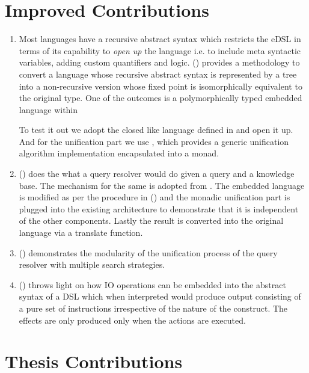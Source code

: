 \documentclass[thesis-solanki.tex]{subfiles}
\begin{document}
\section{Improved Contributions}
\begin{enumerate}
\item Most languages have a recursive abstract syntax which restricts the eDSL in terms of its capability to \textit{open up} the language i.e. to
include meta syntactic variables, adding custom quantifiers and logic. () provides a 
methodology to convert a language whose recursive abstract syntax is represented by a tree into a non-recursive version whose 
fixed point is isomorphically equivalent to the original type. One of the outcomes is a polymorphically typed embedded language within   

To test it out we adopt the closed  like language defined in \cite{prolog-lib} and open it up. And for 
the unification part we use \cite{unification-fd-lib}, which provides a generic unification algorithm implementation encapsulated into a 
monad. 

\item () does the what a  query resolver would do given a query and a knowledge base. 
The mechanism for the same is adopted from \cite{prolog-lib}. The embedded language is modified as per the procedure in 
() and the monadic unification part is plugged into the existing architecture to demonstrate that it 
is independent of the other components. Lastly the result is converted into the original language via a translate function.

\item () demonstrates the modularity of the unification process of the query resolver with multiple search strategies. 

\item () throws light on how IO operations can be embedded into the abstract syntax of a DSL which when interpreted would produce output consisting of 
a pure set of instructions irrespective of the nature of the construct. The effects are only produced only when the actions are executed.    
\end{enumerate}



\section{Thesis Contributions}
\end{document}
